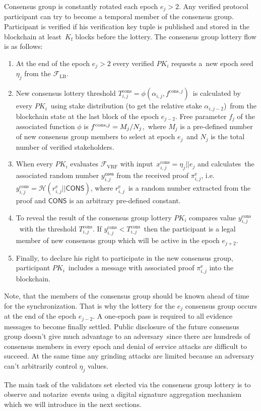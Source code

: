 Consensus group is constantly rotated each epoch ${e_j \gt 2}$.
Any verified protocol participant can try to become a temporal member of the consensus group.
Participant is verified if his verification key tuple is published and stored in the blockchain at least\
$K_{\text{f}}$ blocks before the lottery.
The consensus group lottery flow is as follows:
\begin{enumerate}
    \item At the end of the epoch ${e_j \gt 2}$ every verified $PK_i$ requests a\
    new epoch seed $\eta_j$ from the ${\mathcal{F}}_{\text{LB}}$.
    \item New consensus lottery threshold $T_{i, j}^{\text{cons}} = \phi(\alpha_{i, j}, f^{\text{cons}, j})$\
    is calculated by every $PK_i$\ using stake distribution (to get the relative stake $\alpha_{i, j - 2}$)\
    from the blockchain state at the last block of the epoch $e_{j - 2}$.
    Free parameter $f_j$ of the associated function $\phi$ is ${f^{\text{cons}, j} = M_j /\/ N_j}$,\
    where $M_j$ is a pre-defined number of new consensus group members to select at epoch $e_j$\
    and $N_j$ is the total number of verified stakeholders.
    \item When every $PK_i$ evaluates ${\mathcal{F}}_{\text{VRF}}$ with input\
    $x_{i, j}^{\text{cons}} = \eta_j || e_j $ and calculates\
    the associated random number $y_{i, j}^{\textsf{cons}}$ from the received proof $\pi_{i, j}^{\text{e}}$, i.e.\
    ${y_{i, j}^{\text{cons}} = \mathcal{H}(r_{i, j}^{\text{e}}||\textsf{CONS})}$, where $r_{i, j}^{\text{e}}$\
    is a random number extracted from the proof and $\textsf{CONS}$ is an arbitrary pre-defined constant.
    \item To reveal the result of the consensus group lottery $PK_i$ compares value $y_{i, j}^{\text{cons}}$\
    with the threshold $T_{i, j}^{\text{cons}}$.
    If ${y_{i, j}^{\text{cons}} < T_{i, j}^{\text{cons}}}$\
    then the participant is a legal member of new consensus group which will be active in the epoch $e_{j+2}$.
    \item Finally, to declare his right to participate in the new consensus group, participant $PK_i$\
    includes a message with associated proof $\pi_{i, j}^{\text{e}}$ into the blockchain.
\end{enumerate}
Note, that the members of the consensus group should be known ahead of time for the synchronization.
That is why the lottery for the $e_{j}$ consensus group occurs at the end of the epoch $e_{j - 2}$.
A one-epoch pass is required to all evidence messages to become finally settled.
Public disclosure of the future consensus group doesn't give much advantage to an adversary\
since there are hundreds of consensus members in every epoch and denial of service attacks are difficult to succeed.
At the same time any grinding attacks are limited because an adversary can't arbitrarily control $\eta_j$ values.

The main task of the validators set elected via the consensus group lottery is to observe and notarize\
events using a digital signature aggregation mechanism which we will introduce in the next sections.
